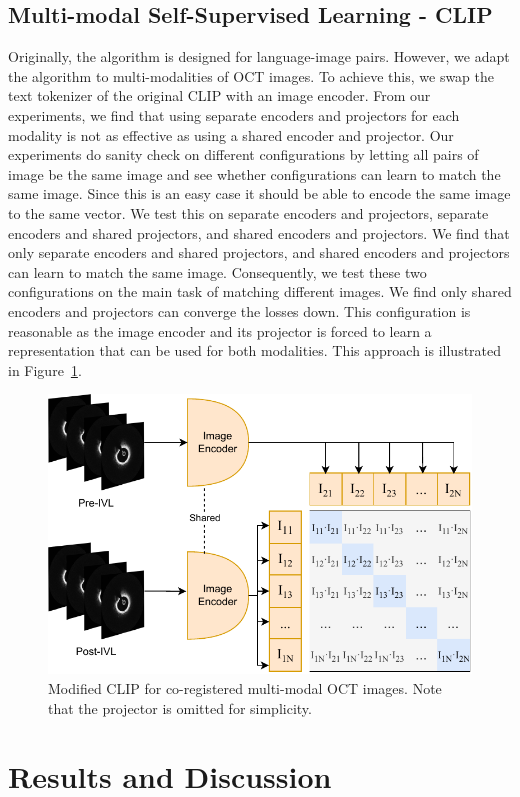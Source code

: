 \documentclass[a4paper,11pt,oneside]{report}
\begin{document}
\section{Multi-modal Self-Supervised Learning - CLIP}\label{sec:implementation:clip}
Originally, the algorithm is designed for language-image pairs. However, we adapt the algorithm to multi-modalities of OCT images. To achieve this, we swap the text tokenizer of the original CLIP with an image encoder. From our experiments, we find that using separate encoders and projectors for each modality is not as effective as using a shared encoder and projector. Our experiments do sanity check on different configurations by letting all pairs of image be the same image and see whether configurations can learn to match the same image. Since this is an easy case it should be able to encode the same image to the same vector. We test this on separate encoders and projectors, separate encoders and shared projectors, and shared encoders and projectors. We find that only separate encoders and shared projectors, and shared encoders and projectors can learn to match the same image. Consequently, we test these two configurations on the main task of matching different images. We find only shared encoders and projectors can converge the losses down. This configuration is reasonable as the image encoder and its projector is forced to learn a representation that can be used for both modalities. This approach is illustrated in Figure~\ref{fig:clip-oct}.

\begin{figure}[b]
    \centering
    \includegraphics[width=0.6\linewidth]{figures/fig_implementation_clip_oct.pdf}
    \caption{Modified CLIP for co-registered multi-modal OCT images. Note that the projector is omitted for simplicity.}
    \label{fig:clip-oct}
\end{figure}

\chapter{Results and Discussion}
\end{document}
